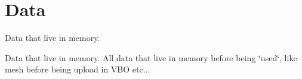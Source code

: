 \hypertarget{group___data}{
\section{\-Data}
\label{group___data}
}


\-Data that live in memory.  


\-Data that live in memory. \-All data that live in memory before being \char`\"{}used\char`\"{}, like mesh before being upload in \-V\-B\-O etc... 